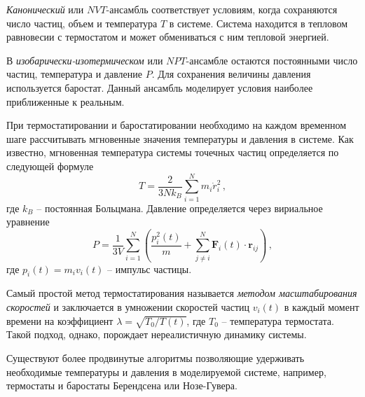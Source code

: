 \par \textit{Канонический} или $NVT$-ансамбль соответствует условиям, когда сохраняются число частиц, объем и температура $T$ в системе. Система находится в тепловом равновесии с термостатом и может обмениваться с ним тепловой энергией.

\par В \textit{изобарически-изотермическом} или $NPT$-ансамбле остаются постоянными число частиц, температура и давление $P$. Для сохранения величины давления используется баростат. Данный ансамбль моделирует условия наиболее приближенные к реальным.

При термостатировании и баростатировании необходимо на каждом временном шаге рассчитывать мгновенные значения температуры и давления в системе.
Как известно, мгновенная температура системы точечных частиц определяется по следующей формуле
\begin{equation}
    T = \dfrac{2}{3Nk_B}\sum\limits_{i=1}^{N}m_{i}\dot{r}_{i}^2\,,
    \label{eq2.4.1}
\end{equation}
где $k_B$ -- постоянная Больцмана.
Давление определяется через вириальное уравнение
\begin{equation}
    P = \dfrac{1}{3V}\sum\limits_{i=1}^N\left(\dfrac{p_i^2(t)}{m} +\sum\limits_{j\neq i}^{N}\mathbf{F}_{i}(t)\cdot\mathbf{r}_{ij}\right)\,,
    \label{eq2.4.2}
\end{equation}
где $p_i(t)=m_{i}v_i(t)$ -- импульс частицы.

Самый простой метод термостатирования называется \textit{методом масштабирования скоростей} и заключается в умножении скоростей частиц $v_i(t)$ в каждый момент времени на коэффициент $\lambda = \sqrt{T_0/T(t)}$, где $T_0$ -- температура термостата. Такой подход, однако, порождает нереалистичную динамику системы.

Существуют более продвинутые алгоритмы позволяющие удерживать необходимые температуры и давления в моделируемой системе, например, термостаты и баростаты Берендсена или Нозе-Гувера.

